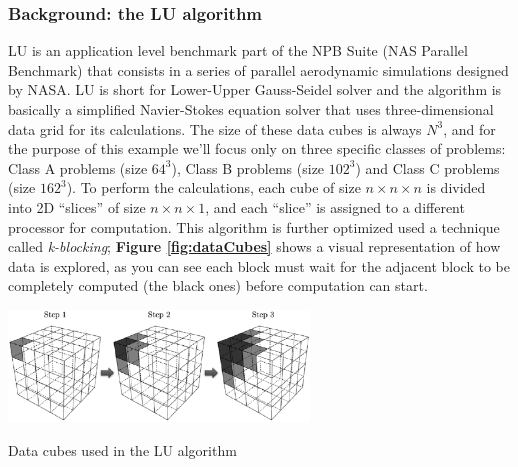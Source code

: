 \subsubsection{Background: the LU algorithm}

LU is an application level benchmark part of the NPB Suite (NAS Parallel Benchmark) that consists in a series of parallel aerodynamic simulations designed by NASA. LU is short for Lower-Upper Gauss-Seidel solver and the algorithm is basically a simplified Navier-Stokes equation solver that uses three-dimensional data grid for its calculations. The size of these data cubes is always \begin{math}N^3\end{math}, and for the purpose of this example we'll focus only on three specific classes of problems: Class A problems (size \begin{math}64^3\end{math}), Class B problems (size \begin{math}102^3\end{math}) and Class C problems (size \begin{math}162^3\end{math}).
To perform the calculations, each cube of size \begin{math}n\times n\times n\end{math} is divided into 2D ``slices'' of size \begin{math}n\times n\times 1\end{math}, and each ``slice'' is assigned to a different processor for computation. This algorithm is further optimized used a technique called \textit{k-blocking}; \textbf{Figure \ref{fig:dataCubes}} shows a visual representation of how data is explored, as you can see each block must wait for the adjacent block to be completely computed (the black ones) before computation can start.\\

\begin{figurehere}
 \centering
 \includegraphics[width=8cm]{./eps/dataCube.eps}
 \caption{Data cubes used in the LU algorithm}
 \label{fig:dataCubes}
\end{figurehere}


